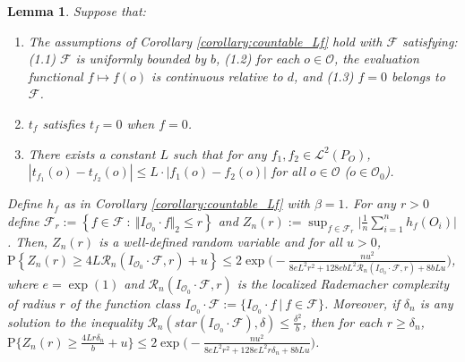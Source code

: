 \documentclass[twoside,11pt]{article}
\newtheorem{lemma}{Lemma}
\newcommand{\mc}{\mathcal}
\begin{document}
\begin{lemma}
Suppose that:
\begin{enumerate}
    \item The assumptions of Corollary \ref{corollary:countable_Lf} hold with $\mc{F}$ satisfying: (1.1) $\mc{F}$ is uniformly bounded by $b$, (1.2) for each $o\in\mc{O}$, the evaluation functional $f\mapsto f(o)$ is continuous relative to $d$, and (1.3) $f=0$ belongs to $\mc{F}$.
    \item $t_f$ satisfies $t_f=0$ when $f=0$.
    \item There exists a constant $L$ such that for any $f_1,f_2\in\mc{L}^2(P_O)$, $|t_{f_1}(o)-t_{f_2}(o)|\le L\cdot\left\vert f_1(o)-f_2(o)\right\vert$ for all $o\in\mc{O}$ ($o\in\mc{O}_0$).
\end{enumerate}
Define $h_f$ as in Corollary \ref{corollary:countable_Lf} with $\beta = 1$. For any $r>0$ define $\mc{F}_r:=\left\{f \in \mc{F}\::\:\Vert I_{\mc{O}_0}\cdot f\Vert_2 \le r \right\}$ and $Z_n(r):=\sup_{f\in \mc{F}_r} \big\vert\frac{1}{n}\sum_{i=1}^nh_f(O_i) \big\vert$. Then, $Z_n(r)$ is a well-defined random variable and for all $u>0$, $\text{P}\left\{Z_n(r)\ge 4L\mathcal{R}_n\left(I_{\mc{O}_0}\cdot\mc{F}, r\right)+u\right\}\le 2\exp\Big(-\frac{nu^2}{8eL^2r^2+128ebL^2\mc{R}_n\left(I_{\mc{O}_0}\cdot \mc{F},r\right)+8bLu}\Big)$,
    where $e=\exp(1)$ and $\mc{R}_n(I_{\mc{O}_0}\cdot\mc{F},r)$ is the localized Rademacher complexity of radius $r$ of the function class $I_{\mc{O}_0}\cdot\mc{F}:=\{I_{\mc{O}_0}\cdot f\:|\:f\in\mc{F}\}$.
    Moreover, if $\delta_n$ is any solution to the inequality $\mc{R}_n\left(star\left(I_{\mc{O}_0}\cdot\mc{F}\right),\delta\right)\le\frac{\delta^2}{b}$,
    then for each $r\ge\delta_n$, $ \text{P}\{Z_n(r)\ge\frac{4Lr\delta_n}{b}+u\}\le 2\exp\Big(-\frac{nu^2}{8eL^2r^2+128eL^2r\delta_n+8bLu}\Big)$.
    \label{lemma:lemma11foster}
\end{lemma}
\end{document}
